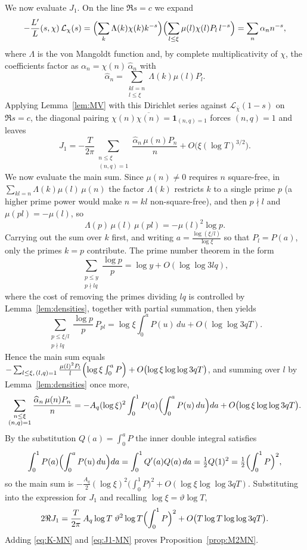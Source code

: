 \documentclass[10pt,a4paper]{amsart}
\numberwithin{equation}{section}
\begin{document}
We now evaluate $J_1$. On the line $\Re s=c$ we expand
\[
-\frac{L'}{L}(s,\chi)\,\mathcal{L}_\chi(s)=\Bigl(\sum_{k}\Lambda(k)\chi(k)k^{-s}\Bigr)\Bigl(\sum_{l\le\xi}\mu(l)\chi(l)P_l\,l^{-s}\Bigr)=\sum_{n}\alpha_n n^{-s},
\]
where $\Lambda$ is the von Mangoldt function and, by complete multiplicativity of $\chi$, the coefficients factor as $\alpha_n=\chi(n)\,\widehat\alpha_n$ with
\[
\widehat\alpha_n=\sum_{\substack{kl=n\\ l\le\xi}}\Lambda(k)\mu(l)P_l .
\]
Applying Lemma~\ref{lem:MV} with this Dirichlet series against $\mathcal{L}_{\bar\chi}(1-s)$ on $\Re s=c$, the diagonal pairing $\chi(n)\overline{\chi(n)}=\mathbf 1_{(n,q)=1}$ forces $(n,q)=1$ and leaves
\[
J_1=-\frac{T}{2\pi}\sum_{\substack{n\le\xi\\(n,q)=1}}\frac{\widehat\alpha_n\,\mu(n)P_n}{n}+O\bigl(\xi(\log T)^{3/2}\bigr).
\]
We now evaluate the main sum. Since $\mu(n)\ne0$ requires $n$ square-free, in $\sum_{kl=n}\Lambda(k)\mu(l)\,\mu(n)$ the factor $\Lambda(k)$ restricts $k$ to a single prime $p$ (a higher prime power would make $n=kl$ non-square-free), and then $p\nmid l$ and $\mu(pl)=-\mu(l)$, so
\[
\Lambda(p)\,\mu(l)\,\mu(pl)=-\mu(l)^2\log p .
\]
Carrying out the sum over $k$ first, and writing $a=\frac{\log(\xi/l)}{\log\xi}$ so that $P_l=P(a)$, only the primes $k=p$ contribute. The prime number theorem in the form
\[
\sum_{\substack{p\le y\\ p\nmid lq}}\frac{\log p}{p}=\log y+O(\log\log 3lq),
\]
where the cost of removing the primes dividing $lq$ is controlled by Lemma~\ref{lem:densities}, together with partial summation, then yields
\[
\sum_{\substack{p\le\xi/l\\ p\nmid lq}}\frac{\log p}{p}\,P_{pl}=\log\xi\int_0^a P(u)\,du+O(\log\log 3qT).
\]
Hence the main sum equals $-\sum_{l\le\xi,\,(l,q)=1}\frac{\mu(l)^2 P_l}{l}\Bigl(\log\xi\int_0^a P\Bigr)+O\bigl(\log\xi\log\log 3qT\bigr)$, and summing over $l$ by Lemma~\ref{lem:densities} once more,
\[
\sum_{\substack{n\le\xi\\(n,q)=1}}\frac{\widehat\alpha_n\,\mu(n)P_n}{n}
=-A_q(\log\xi)^2\int_0^1 P(a)\Bigl(\int_0^a P(u)\,du\Bigr)da+O\bigl(\log\xi\log\log 3qT\bigr).
\]
By the substitution $Q(a)=\int_0^a P$ the inner double integral satisfies
\[
\int_0^1 P(a)\Bigl(\int_0^a P(u)\,du\Bigr)da=\int_0^1 Q'(a)Q(a)\,da=\tfrac12 Q(1)^2=\tfrac12\Bigl(\int_0^1 P\Bigr)^2,
\]
so the main sum is $-\tfrac{A_q}{2}(\log\xi)^2\bigl(\int_0^1 P\bigr)^2+O(\log\xi\log\log 3qT)$. Substituting into the expression for $J_1$ and recalling $\log\xi=\vartheta\log T$,
\begin{equation}\label{eq:J1-MN}
2\Re J_1=\frac{T}{2\pi}\,A_q\log T\;\vartheta^2\log T\Bigl(\int_0^1 P\Bigr)^2+O\bigl(T\log T\log\log 3qT\bigr).
\end{equation}
Adding \eqref{eq:K-MN} and \eqref{eq:J1-MN} proves Proposition~\ref{prop:M2MN}.
\end{document}
